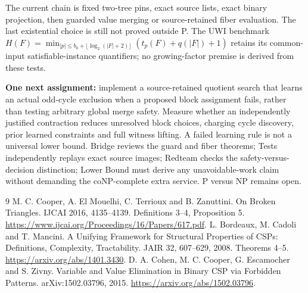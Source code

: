 \documentclass[11pt]{article}
\begin{document}
The current chain is fixed two-tree pins, exact source lists, exact binary
projection, then guarded value merging or source-retained fiber evaluation.
The last existential choice is still not proved outside P. The UWI benchmark
$H(F)=\min_{|p|\le b_0+\lfloor\log_2(|F|+2)\rfloor}(t_p(F)+q(|F|)+1)$
retains its common-input satisfiable-instance quantifiers; no growing-factor
premise is derived from these tests.

\textbf{One next assignment:} implement a source-retained quotient search
that learns an actual odd-cycle exclusion when a proposed block assignment
fails, rather than testing arbitrary global merge safety. Measure whether
an independently justified contraction reduces unresolved block choices,
charging cycle discovery, prior learned constraints and full witness lifting.
A failed learning rule is not a universal lower bound. Bridge reviews the
guard and fiber theorems; Tests independently replays exact source images;
Redteam checks the safety-versus-decision distinction; Lower Bound must derive
any unavoidable-work claim without demanding the coNP-complete extra service.
P versus NP remains open.

\begin{thebibliography}{9}
 M. C. Cooper, A. El Mouelhi, C. Terrioux and B. Zanuttini.
On Broken Triangles. IJCAI 2016, 4135--4139. Definitions 3--4, Proposition 5.
\url{https://www.ijcai.org/Proceedings/16/Papers/617.pdf}.
 L. Bordeaux, M. Cadoli and T. Mancini.
A Unifying Framework for Structural Properties of CSPs: Definitions,
Complexity, Tractability. JAIR 32, 607--629, 2008. Theorems 4--5.
\url{https://arxiv.org/abs/1401.3430}.
 D. A. Cohen, M. C. Cooper, G. Escamocher and S. Zivny.
Variable and Value Elimination in Binary CSP via Forbidden Patterns.
arXiv:1502.03796, 2015. \url{https://arxiv.org/abs/1502.03796}.
\end{thebibliography}
\end{document}

